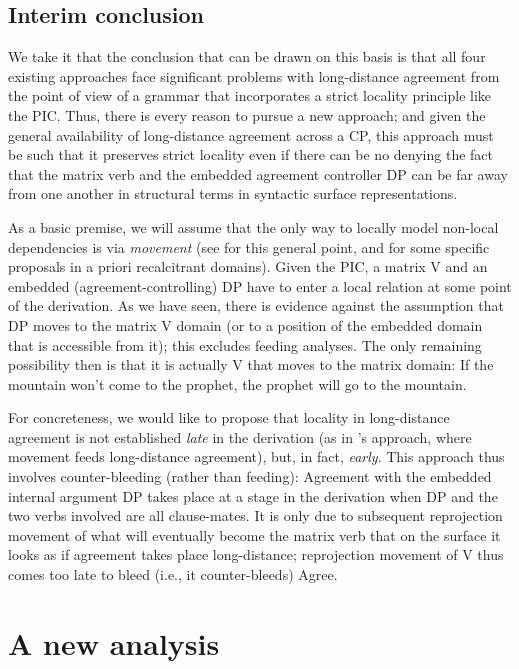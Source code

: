 \documentclass[output=paper
,modfonts
,nonflat]{langsci/langscibook}
\begin{document}
	\subsection{Interim conclusion}
	
	We take it that the conclusion that can be drawn on this basis is that
	all four existing approaches face significant problems with
	long-distance agreement from the point of view of a grammar that
	incorporates a strict locality principle like the PIC. Thus, there is
	every reason to pursue a  new approach; and given the general
	availability of long-distance agreement across a CP, this approach
	must be such that it preserves strict locality even if there can be no
	denying the fact that the matrix verb and the embedded agreement
	controller DP can be far away from one another in structural terms in
	syntactic surface representations. 
	
	As a basic premise, we will assume that the only way to locally model
	non-local dependencies is via {\itshape movement} (see
	\citealt{Hornstein:01,Hornstein:09} for this general point, and
	\citealt{Mueller:14:buf} for some specific proposals in a priori
	recalcitrant domains). Given the PIC, a matrix V and an embedded
	(agreement-controlling) DP have to enter a local relation at some
	point of the derivation. As we have seen, there is evidence against
	the assumption that DP moves to the matrix V domain (or to a position
	of the embedded domain that is accessible from it); this excludes feeding
	analyses. The only remaining possibility then is that it is actually
	V that moves to the matrix domain: If the mountain won't come to the
	prophet, the prophet will go to the mountain.
	
	For concreteness, we would like to propose that locality in
	long-distance agreement is not established {\itshape late} in the
	derivation (as in \citealt{PolinskyPotsdam:01}'s approach, where
	movement feeds long-distance agreement), but, in fact, {\it
		early}. This approach thus involves counter-bleeding (rather than
	feeding): Agreement with the embedded internal argument DP takes place
	at a stage in the derivation when DP and the two verbs involved are
	all clause-mates. It is only due to subsequent reprojection movement
	of what will eventually become the matrix verb 
	that on the surface it looks as if agreement takes place
	long-distance; reprojection movement of V thus comes too late to bleed
	(i.e., it counter-bleeds) Agree.
	
	
	\section{A new analysis} \label{sec-bjoe-muel:3}
	
\end{document}
